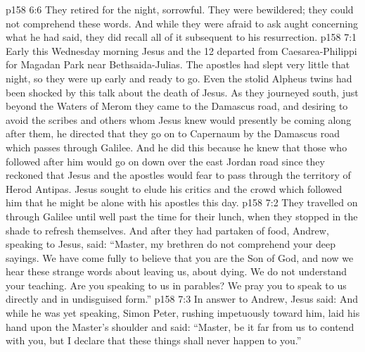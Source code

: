 \vs p158 6:6 They retired for the night, sorrowful. They were bewildered; they could not comprehend these words. And while they were afraid to ask aught concerning what he had said, they did recall all of it subsequent to his resurrection.
\vs p158 7:1 Early this Wednesday morning Jesus and the 12 departed from Caesarea\hyp{}Philippi for Magadan Park near Bethsaida\hyp{}Julias. The apostles had slept very little that night, so they were up early and ready to go. Even the stolid Alpheus twins had been shocked by this talk about the death of Jesus. As they journeyed south, just beyond the Waters of Merom they came to the Damascus road, and desiring to avoid the scribes and others whom Jesus knew would presently be coming along after them, he directed that they go on to Capernaum by the Damascus road which passes through Galilee. And he did this because he knew that those who followed after him would go on down over the east Jordan road since they reckoned that Jesus and the apostles would fear to pass through the territory of Herod Antipas. Jesus sought to elude his critics and the crowd which followed him that he might be alone with his apostles this day.
\vs p158 7:2 They travelled on through Galilee until well past the time for their lunch, when they stopped in the shade to refresh themselves. And after they had partaken of food, Andrew, speaking to Jesus, said: “Master, my brethren do not comprehend your deep sayings. We have come fully to believe that you are the Son of God, and now we hear these strange words about leaving us, about dying. We do not understand your teaching. Are you speaking to us in parables? We pray you to speak to us directly and in undisguised form.”
\vs p158 7:3 In answer to Andrew, Jesus said:  And while he was yet speaking, Simon Peter, rushing impetuously toward him, laid his hand upon the Master’s shoulder and said: “Master, be it far from us to contend with you, but I declare that these things shall never happen to you.”
